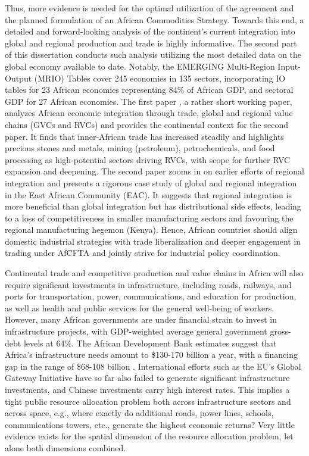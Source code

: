 \documentclass[a4paper]{article}
\begin{document}
Thus, more evidence is needed for the optimal utilization of the agreement and the planned formulation of an African Commodities Strategy. Towards this end, a detailed and forward-looking analysis of the continent's current integration into global and regional production and trade is highly informative. The second part of this dissertation conducts such analysis utilizing the most detailed data on the global economy available to date. Notably, the EMERGING Multi-Region Input-Output (MRIO) Tables \citep{huo2022full} cover 245 economies in 135 sectors, incorporating IO tables for 23 African economies representing 84\% of African GDP, and sectoral GDP for 27 African economies. The first paper \citep{krantz2024africas}, a rather short working paper, analyzes African economic integration through trade, global and regional value chains (GVCs and RVCs) and provides the continental context for the second paper. It finds that inner-African trade has increased steadily and highlights precious stones and metals, mining (petroleum), petrochemicals, and food processing as high-potential sectors driving RVCs, with scope for further RVC expansion and deepening. The second paper \citep{krantz2024patterns} zooms in on earlier efforts of regional integration and presents a rigorous case study of global and regional integration in the East African Community (EAC). It suggests that regional integration is more beneficial than global integration but has distributional side effects, leading to a loss of competitiveness in smaller manufacturing sectors and favouring the regional manufacturing hegemon (Kenya). Hence, African countries should align domestic industrial strategies with trade liberalization and deeper engagement in trading under AfCFTA and jointly strive for industrial policy coordination. \newline    


Continental trade and competitive production and value chains in Africa will also require significant investments in infrastructure, including roads, railways, and ports for transportation, power, communications, and education for production, as well as health and public services for the general well-being of workers. However, many African governments are under financial strain to invest in infrastructure projects, with GDP-weighted average general government gross-debt levels at 64\%. The African Development Bank estimates suggest that Africa's infrastructure needs amount to \$130-170 billion a year, with a financing gap in the range of \$68-108 billion \citep{african2018africa}. International efforts such as the EU's Global Gateway Initiative have so far also failed to generate significant infrastructure investments, and Chinese investments carry high interest rates. This implies a tight public resource allocation problem both across infrastructure sectors and across space, e.g., where exactly do additional roads, power lines, schools, communications towers, etc., generate the highest economic returns? Very little evidence exists for the spatial dimension of the resource allocation problem, let alone both dimensions combined. \newline 
\end{document}
